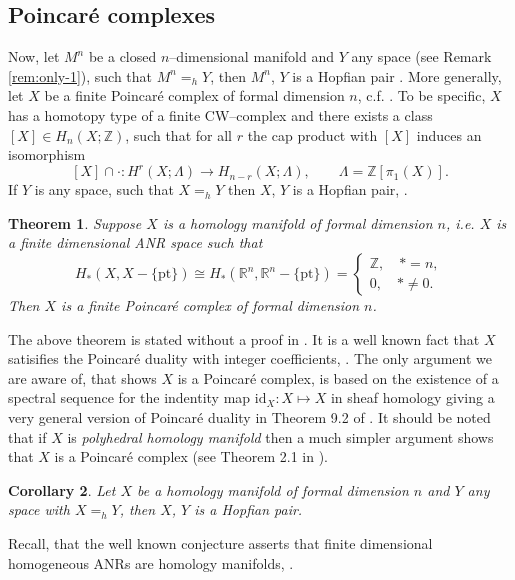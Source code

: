 \documentclass[reqno,12pt]{amsart}
\newtheorem{theorem}{Theorem}
\newtheorem{corollary}[theorem]{Corollary}
\theoremstyle{ourremark}
\numberwithin{equation}{section}
\numberwithin{theorem}{section}
\begin{document}
\subsection{Poincar\'e complexes}  Now, let $M^n$ be a closed $n$--dimensional manifold and $Y$ any space (see Remark \ref{rem:only-1}), such that $M^n=_h Y$, then $M^n$, $Y$ is a Hopfian pair \cite{Berstein-Ganea59, Kwasik84}. More generally, let $X$ be a finite Poincar\'e complex of formal dimension $n$, c.f. \cite{Wall-book99}. To be specific, $X$ has a homotopy type of a finite CW--complex and there exists a class $[X]\in H_n(X;{\mathbb{Z}})$, such that for all $r$ the cap product with $[X]$ induces an isomorphism
\[
 [X]\cap\cdot :H^r(X;\Lambda)\longrightarrow H_{n-r} (X;\Lambda),\qquad \Lambda={\mathbb{Z}}[\pi_1(X)].
\]
If $Y$ is any space, such that $X=_h Y$ then $X$, $Y$ is a Hopfian pair, \cite{Kwasik84}. 
\begin{theorem}
 Suppose $X$ is a homology manifold of formal dimension $n$, i.e. $X$ is a finite dimensional ANR space such that
\[
H_\ast(X,X-\{\text{pt}\})\cong H_\ast({\mathbb{R}}^n,{\mathbb{R}}^n-\{\text{pt}\})=\begin{cases}
{\mathbb{Z}},\quad \ast=n,\\
0,\quad \ast\neq 0.
\end{cases}
\]
 Then $X$ is a finite Poincar\'e complex of formal dimension $n$.
\end{theorem}
 The above theorem is stated without a proof in \cite[p. 5099]{Johnston-Ranicki-00}. It is a well known fact that $X$ satisifies the Poincar\'e duality with integer coefficients, \cite{Borel57}. The only argument we are aware of, that shows $X$ is a Poincar\'e complex, is based on the existence of a spectral sequence for the indentity map $\text{id}_X: X\longmapsto X$ in sheaf homology giving a very general version of Poincar\'e duality in Theorem 9.2 of \cite{Bredon-book97}. It should be noted that if $X$ is {\em polyhedral homology manifold} then a much simpler argument shows that $X$ is a Poincar\'e complex (see Theorem 2.1 in \cite{Wall-book99}).
\begin{corollary}
Let $X$ be a homology manifold of formal dimension $n$ and $Y$ any space with $X=_h Y$, then $X$, $Y$ is a Hopfian pair.
\end{corollary}
Recall, that the well known conjecture asserts that finite dimensional homogeneous ANRs are homology manifolds, \cite{Bryant-Ferry-Mio-Weinberger96}.
\end{document}
